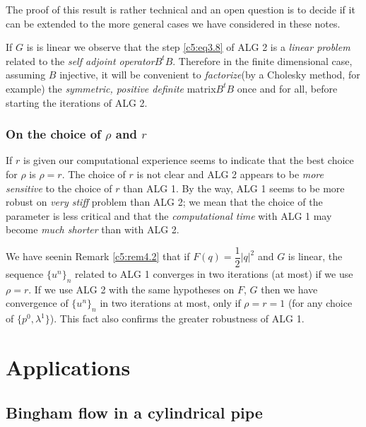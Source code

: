 The proof of this result is rather technical and an open question is to decide if it can be extended to the more general cases we have considered in these notes.
 
\begin{remark}\label{c5:rem5.2}%
If $G$ is is linear we observe that the step \eqref{c5:eq3.8} of ALG 2 is a \textit{linear problem}  related to the \textit{self adjoint operator}$B^t B$.  Therefore in the finite dimensional case, assuming $B$ injective,  it will be convenient to \textit{factorize}(by a Cholesky method, for example) the \textit{symmetric, positive definite} matrix$B^tB$ once and for all,  before starting the iterations of ALG 2. 
\end{remark}

\subsubsection{On the choice of $\rho$ and $r$}\label{c5:sss5.4.2}

If $r$ is given our computational experience seems to indicate that
the best choice for $\rho$ is $\rho =r$.  The choice of $r$ is  not
clear  and ALG 2 appears to be \textit{more sensitive} to the choice
of $r$ than ALG 1. By the way, ALG 1 seems to be more robust on
\textit{very stiff} problem 
than ALG 2; we mean that the choice of the parameter is less critical
and that the \textit{computational time} with ALG  1 may become
\textit{much shorter} than with ALG 2.  

\begin{remark}\label{c5:rem5.3}%
 We have seen\pageoriginale   in Remark \ref{c5:rem4.2} that if $F (q) = \dfrac{1}{2} | q |^2$ and $G$ is linear, the sequence $\{ u^n \}_n$ related to ALG 1 converges in two iterations (at most) if we use $\rho = r$. If we use ALG  2 with the same hypotheses on $F$, $G$ then we have convergence of $\{ u^n \}_n$ in two iterations at  most, only if $\rho = r =1$ (for any choice of $\{ p^0, \lambda^1 \}$). This fact also confirms the greater robustness of ALG 1.  
\end{remark}

\section{Applications}\label{c5:s6}%

\subsection{Bingham flow in a cylindrical pipe}\label{c5:ss6.1}%


